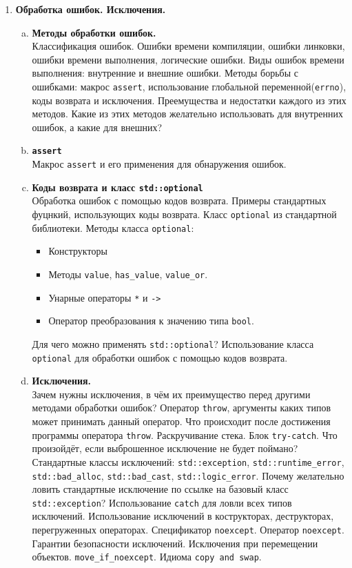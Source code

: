 \documentclass{article}
\begin{document}
\begin{enumerate}
\item \textbf{Обработка ошибок. Исключения.}
\begin{enumerate}[a.]
\item \textbf{Методы обработки ошибок.}\\
Классификация ошибок. Ошибки времени компиляции, ошибки линковки, ошибки времени выполнения, логические ошибки.
Виды ошибок времени выполнения: внутренние и внешние ошибки. Методы борьбы с ошибками: макрос \texttt{assert}, использование глобальной переменной(\texttt{errno}), коды возврата и исключения. Преемущества и недостатки каждого из этих методов. Какие из этих методов желательно использовать для внутренних ошибок, а какие для внешних?

\item \textbf{\texttt{assert}}\\
Макрос \texttt{assert} и его применения для обнаружения ошибок.

\item \textbf{Коды возврата и класс \texttt{std::optional}}\\
Обработка ошибок с помощью кодов возврата. Примеры стандартных фуцнкий, использующих коды возврата.
Класс \texttt{optional} из стандартной библиотеки.
Методы класса \texttt{optional}:
\begin{itemize}
\item Конструкторы
\item Методы \texttt{value}, \texttt{has\_value}, \texttt{value\_or}.
\item Унарные операторы \texttt{*} и \texttt{->}
\item Оператор преобразования к значению типа \texttt{bool}.
\end{itemize}
Для чего можно применять \texttt{std::optional}? Использование класса \texttt{optional} для обработки ошибок с помощью кодов возврата.

\item \textbf{Исключения.}\\
Зачем нужны исключения, в чём их преимущество перед другими методами обработки ошибок?
Оператор \texttt{throw}, аргументы каких типов может принимать данный оператор. Что происходит после достижения программы оператора \texttt{throw}. Раскручивание стека. Блок \texttt{try-catch}. Что произойдёт, если выброшенное исключение не будет поймано? Стандартные классы исключений: \texttt{std::exception}, \texttt{std::runtime\_error}, \texttt{std::bad\_alloc}, \texttt{std::bad\_cast}, \texttt{std::logic\_error}. Почему желательно ловить стандартные исключение по ссылке на базовый класс \texttt{std::exception}? Использование \texttt{catch} для ловли всех типов исключений. Использование исключений в кострукторах, деструкторах, перегруженных операторах. Спецификатор \texttt{noexcept}. Оператор \texttt{noexcept}. Гарантии безопасности исключений. Исключения при перемещении объектов. \texttt{move\_if\_noexcept}. Идиома \texttt{copy and swap}.


\end{enumerate}
\end{enumerate}
\end{document}
